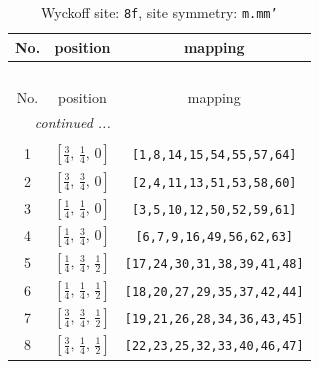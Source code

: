 \documentclass[fleqn,8pt]{jsarticle}
\begin{document}
\begin{longtable}{ccc}
\caption{Wyckoff site: {\tt 8f}, site symmetry: {\tt m.mm'}}
 \\
 \hline \hline
No. & position & mapping \\ \hline \endfirsthead

\multicolumn{2}{l}{\tablename\ \thetable{}} \\
 \hline \hline
No. & position & mapping \\ \hline \endhead

 \hline \hline
\multicolumn{2}{r}{\footnotesize\it continued ...} \\ \endfoot

 \hline \hline
\multicolumn{2}{r}{} \\ \endlastfoot

1 & $\left[ \frac{3}{4},\, \frac{1}{4},\, 0 \right]$ & {\tt [1,8,14,15,54,55,57,64]} \\ \hline
2 & $\left[ \frac{3}{4},\, \frac{3}{4},\, 0 \right]$ & {\tt [2,4,11,13,51,53,58,60]} \\ \hline
3 & $\left[ \frac{1}{4},\, \frac{1}{4},\, 0 \right]$ & {\tt [3,5,10,12,50,52,59,61]} \\ \hline
4 & $\left[ \frac{1}{4},\, \frac{3}{4},\, 0 \right]$ & {\tt [6,7,9,16,49,56,62,63]} \\ \hline
5 & $\left[ \frac{1}{4},\, \frac{3}{4},\, \frac{1}{2} \right]$ & {\tt [17,24,30,31,38,39,41,48]} \\ \hline
6 & $\left[ \frac{1}{4},\, \frac{1}{4},\, \frac{1}{2} \right]$ & {\tt [18,20,27,29,35,37,42,44]} \\ \hline
7 & $\left[ \frac{3}{4},\, \frac{3}{4},\, \frac{1}{2} \right]$ & {\tt [19,21,26,28,34,36,43,45]} \\ \hline
8 & $\left[ \frac{3}{4},\, \frac{1}{4},\, \frac{1}{2} \right]$ & {\tt [22,23,25,32,33,40,46,47]} \\
\end{longtable}
\renewcommand{\arraystretch}{1.2}
\end{document}
